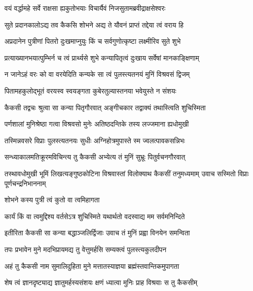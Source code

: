 \twolineshloka
{वयं वर्द्धामहे सर्वे राक्षसा ह्यकुतोभयाः}
{विचार्यैवं निजसुतामब्रवीद्राक्षसेश्वरः}%

\twolineshloka
{सुते प्रदानकालोऽद्य तव कैकसि शोभने}
{अद्य ते यौवनं प्राप्तं तद्देया त्वं वराय हि}%

\twolineshloka
{अप्रदानेन पुत्रीणां पितरो दुःखमाप्नुयुः}
{किं च सर्वगुणोत्कृष्टा लक्ष्मीरिव सुते शुभे}%

\twolineshloka
{प्रत्याख्यानभयात्पुम्भिर्न च त्वं प्रार्थ्यसे शुभे}
{कन्यापितृत्वं दुःखाय सर्वेषां मानकाङ्क्षिणाम्}%

\twolineshloka
{न जानेऽहं वरः को वा वरयेदिति कन्यके}
{सा त्वं पुलस्त्यतनयं मुनिं विश्रवसं द्विजम्}%

\twolineshloka
{पितामहकुलोद्भूतं वरयस्व स्वयङ्गता}
{कुबेरतुल्यास्तनया भवेयुस्ते न संशयः}%

\twolineshloka
{कैकसी तद्वचः श्रुत्वा सा कन्या पितृगौरवात्}
{अङ्गीचकार तद्वाक्यं तथास्त्विति शुचिस्मिता}%

\twolineshloka
{पर्णशालां मुनिश्रेष्ठा गत्वा विश्रवसो मुनेः}
{अतिष्ठदन्तिके तस्य लज्जमाना ह्यधोमुखी}%

\twolineshloka
{तस्मिन्नवसरे विप्राः पुलस्त्यतनयः सुधीः}
{अग्निहोत्रमुपास्ते स्म ज्वलत्पावकसन्निभः}%

\twolineshloka
{सन्ध्याकालमतिक्रूरमविचिन्त्य तु कैकसी}
{अभ्येत्य तं मुनिं सुभ्रूः पितुर्वचनगौरवात्}%

\threelineshloka
{तस्थावधोमुखी भूमिं लिखत्यङ्गुष्ठकोटिना}
{विश्रवास्तां विलोक्याथ कैकसीं तनुमध्यमाम्}
{उवाच सस्मितो विप्राः पूर्णचन्द्रनिभाननाम्}%


\onelineshloka
{शोभने कस्य पुत्री त्वं कुतो वा त्वमिहागता}%

\twolineshloka
{कार्यं किं वा त्वमुद्दिश्य वर्तसेऽत्र शुचिस्मिते}
{यथार्थतो वदस्वाद्य मम सर्वमनिन्दिते}%

\twolineshloka
{इतीरिता कैकसी सा कन्या बद्धाञ्जलिर्द्विजाः}
{उवाच तं मुनिं प्रह्वा विनयेन समन्विता}%

\twolineshloka
{तपः प्रभावेन मुने मदभिप्रायमद्य तु}
{वेत्तुमर्हसि सम्यक्त्वं पुलस्त्यकुलदीपन}%

\twolineshloka
{अहं तु कैकसी नाम सुमालिदुहिता मुने}
{मत्तातस्याज्ञया ब्रह्मंस्तवान्तिकमुपागता}%

\twolineshloka
{शेष त्वं ज्ञानदृष्ट्याद्य ज्ञातुमर्हस्यसंशयः}
{क्षणं ध्यात्वा मुनिः प्राह विश्रवाः स तु कैकसीम्}%

